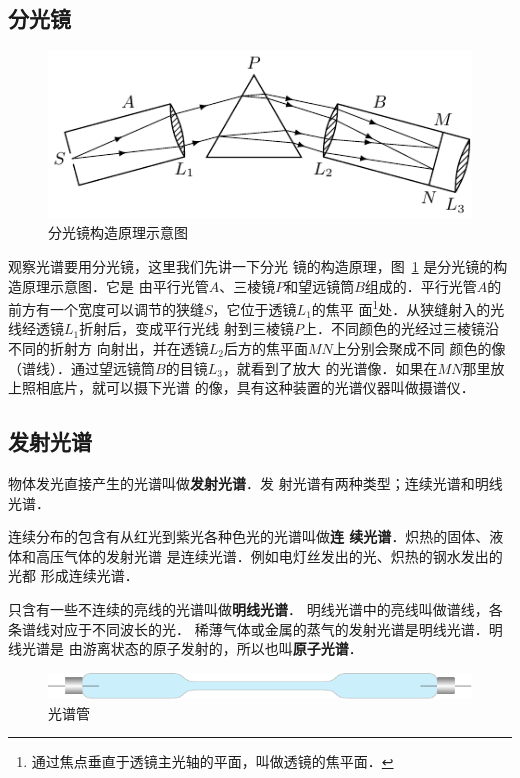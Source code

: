 \subsection{分光镜}
\begin{figure}[htbp]
    \centering
    \includegraphics{fig/C/6-18.pdf}
    \caption{分光镜构造原理示意图}\label{fig_C_6-18}
\end{figure}

观察光谱要用分光镜，这里我们先讲一下分光
镜的构造原理，图~\ref{fig_C_6-18} 是分光镜的构造原理示意图．它是
由平行光管$A$、三棱镜$P$和望远镜筒$B$组成的．平行光管$A$的
前方有一个宽度可以调节的狭缝$S$，它位于透镜$L_1$的焦平
面\footnote{通过焦点垂直于透镜主光轴的平面，叫做透镜的焦平面．}处．从狭缝射入的光线经透镜$L_1$折射后，变成平行光线
射到三棱镜$P$上．不同颜色的光经过三棱镜沿不同的折射方
向射出，并在透镜$L_2$后方的焦平面$MN$上分别会聚成不同
颜色的像（谱线）．通过望远镜筒$B$的目镜$L_3$，就看到了放大
的光谱像．如果在$MN$那里放上照相底片，就可以摄下光谱
的像，具有这种装置的光谱仪器叫做摄谱仪．

\subsection{发射光谱}

物体发光直接产生的光谱叫做\textbf{发射光谱}．发
射光谱有两种类型；连续光谱和明线光谱．

连续分布的包含有从红光到紫光各种色光的光谱叫做\textbf{连
续光谱}．炽热的固体、液体和高压气体的发射光谱
是连续光谱．例如电灯丝发出的光、炽热的钢水发出的光都
形成连续光谱．

只含有一些不连续的亮线的光谱叫做\textbf{明线光谱}．
明线光谱中的亮线叫做谱线，各条谱线对应于不同波长的光．
稀薄气体或金属的蒸气的发射光谱是明线光谱．明线光谱是
由游离状态的原子发射的，所以也叫\textbf{原子光谱}．
\begin{figure}[htbp]
    \centering
    \includegraphics{fig/C/6-19.pdf}
    \caption{光谱管}\label{fig_C_6-19}
\end{figure}

